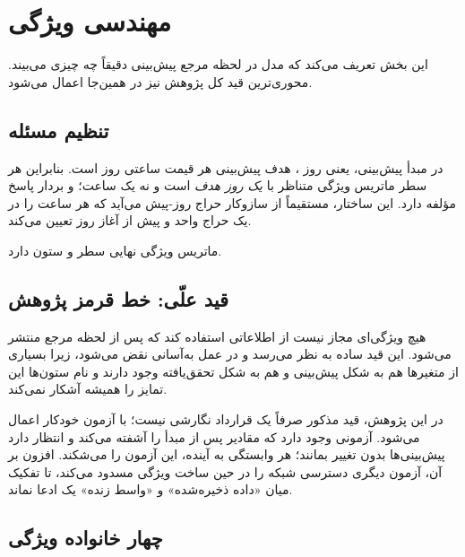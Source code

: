 
\section{مهندسی ویژگی}

این بخش تعریف می‌کند که مدل در لحظه مرجع پیش‌بینی دقیقاً چه چیزی می‌بیند.
محوری‌ترین قید کل پژوهش نیز در همین‌جا اعمال می‌شود.

\subsection*{تنظیم مسئله}

در مبدأ پیش‌بینی، یعنی روز ، هدف پیش‌بینی هر  قیمت ساعتی روز
 است. بنابراین هر سطر ماتریس ویژگی متناظر با \emph{یک روز هدف}
است و نه یک ساعت؛ و بردار پاسخ  مؤلفه دارد. این ساختار، مستقیماً
از سازوکار حراج روز-پیش می‌آید که هر  ساعت را در یک حراج واحد و
پیش از آغاز روز تعیین می‌کند.

ماتریس ویژگی نهایی  سطر و  ستون دارد.

\subsection*{قید علّی: خط قرمز پژوهش}

هیچ ویژگی‌ای مجاز نیست از اطلاعاتی استفاده کند که پس از لحظه مرجع منتشر
می‌شود. این قید ساده به نظر می‌رسد و در عمل به‌آسانی نقض می‌شود، زیرا
بسیاری از متغیرها هم به شکل پیش‌بینی و هم به شکل تحقق‌یافته وجود دارند و
نام ستون‌ها این تمایز را همیشه آشکار نمی‌کند.

در این پژوهش، قید مذکور صرفاً یک قرارداد نگارشی نیست؛ با آزمون خودکار
اعمال می‌شود. آزمونی وجود دارد که مقادیر پس از مبدأ را آشفته می‌کند و
انتظار دارد پیش‌بینی‌ها بدون تغییر بمانند؛ هر وابستگی به آینده، این
آزمون را می‌شکند. افزون بر آن، آزمون دیگری دسترسی شبکه را در حین ساخت
ویژگی مسدود می‌کند، تا تفکیک میان «داده ذخیره‌شده» و «واسط زنده» یک ادعا
نماند.

\subsection*{چهار خانواده ویژگی}

